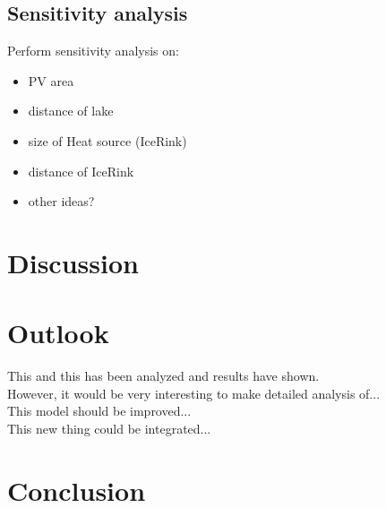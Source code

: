 \documentclass{article}
\begin{document}
\subsection{Sensitivity analysis}
Perform sensitivity analysis on:
\begin{itemize}
    \item PV area
    \item distance of lake
    \item size of Heat source (IceRink)
    \item distance of IceRink
    \item other ideas?
\end{itemize}

\section{Discussion}

\section{Outlook}
This and this has been analyzed and results have shown.\\
However, it would be very interesting to make detailed analysis of...\\
This model should be improved...\\
This new thing could be integrated...\\

\section{Conclusion}


\clearpage


\clearpage



\end{document}
